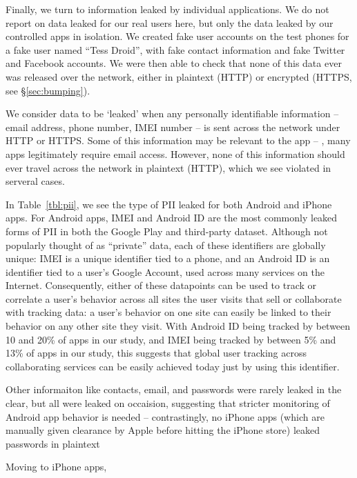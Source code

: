   Finally, we turn to information leaked by individual applications. We do not report on data leaked for our real users here, but only the data leaked by our controlled apps in isolation.
  We created fake user accounts on the test phones for a fake user named ``Tess Droid'', with fake contact information and fake Twitter and Facebook accounts. 
  We were then able to check that none of this data ever was released over the network, either in plaintext (HTTP) or encrypted (HTTPS, see \S\ref{sec:bumping}).
  
  We consider data to be `leaked' when any personally identifiable information -- email address, phone number, IMEI number -- is sent across the network under HTTP or HTTPS.
  Some of this information may be relevant to the app -- \eg{}, many apps legitimately require email access. 
  However, none of this information should ever travel across the network in plaintext (HTTP), which we see violated in serveral cases.

  In Table~\ref{tbl:pii}, we see the type of PII leaked for both Android and iPhone apps.
  For Android apps, IMEI and Android ID are the most commonly leaked forms of PII in both the Google Play and third-party dataset.
  Although not popularly thought of as ``private'' data, each of these identifiers are globally unique: IMEI is a unique identifier tied to a phone, and an Android ID is an identifier tied to a user's Google Account, used across many services on the Internet. 
  Consequently, either of these datapoints can be used to track or correlate a user's behavior across all sites the user visits that sell or collaborate with tracking data: a user's behavior on one site can easily be linked to their behavior on any other site they visit.
  With Android ID being tracked by between 10 and 20\% of apps in our study, and IMEI being tracked by between 5\% and 13\% of apps in our study, this suggests that global user tracking across collaborating services can be easily achieved today just by using this identifier.

  Other informaiton like contacts, email, and passwords were rarely leaked in the clear, but all were leaked on occaision, suggesting that stricter monitoring of Android app behavior is needed -- contrastingly, no iPhone apps (which are manually given clearance by Apple before hitting the iPhone store) leaked passwords in plaintext~

  Moving to iPhone apps, 





